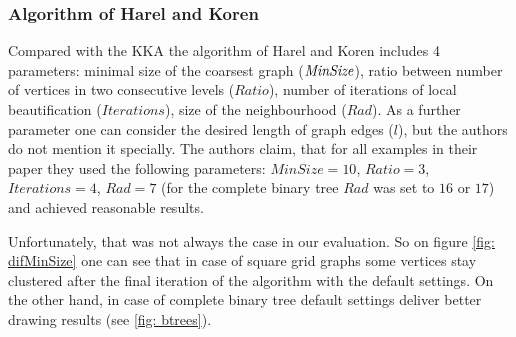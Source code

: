 \documentclass[12pt,a4paper]{article}
\begin{document}
\FloatBarrier 
\subsubsection*{Algorithm of Harel and Koren}

Compared with the KKA the algorithm of Harel and Koren includes 4 parameters: minimal size of the coarsest graph ($\it MinSize$), ratio between number of vertices in two consecutive levels ($Ratio$), number of iterations of local beautification ($Iterations$), size of the neighbourhood ($Rad$). As a further parameter one can consider the desired length of graph edges ($l$), but the authors do not mention it specially. The authors claim, that for all examples in their paper they used the following parameters: $MinSize=10$, $Ratio=3$, $Iterations=4$, $Rad = 7$ (for the complete binary tree $Rad$ was set to $16$ or $17$) and achieved reasonable results.

Unfortunately, that was not always the case in our evaluation. So on figure \ref{fig: difMinSize} one can see that in case of square grid graphs some vertices stay clustered after the final iteration of the algorithm with the default settings. On the other hand, in case of complete binary tree default settings deliver better drawing results (see \ref{fig: btrees}).
\end{document}
